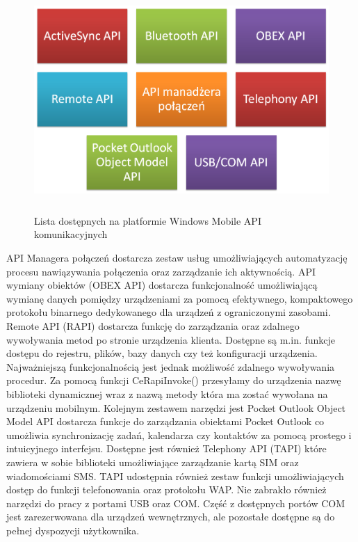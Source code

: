 \begin{figure}[h!]
 \centering \includegraphics[height=85mm]{../images/ch03/wm_comm_api.png}
 \caption{Lista dostępnych na platformie Windows Mobile API komunikacyjnych}
 \label{fig:WMCommunicationAPI}
\end{figure}

API Managera połączeń dostarcza zestaw usług umożliwiających automatyzację
procesu nawiązywania połączenia oraz zarządzanie ich aktywnością. API wymiany
obiektów (OBEX API) dostarcza funkcjonalność umożliwiającą wymianę danych
pomiędzy urządzeniami za pomocą efektywnego, kompaktowego protokołu binarnego
dedykowanego dla urządzeń z ograniczonymi zasobami. Remote API (RAPI) dostarcza
funkcję do zarządzania oraz zdalnego wywoływania metod po stronie urządzenia
klienta. Dostępne są m.in. funkcje dostępu do rejestru, plików, bazy danych czy
też konfiguracji urządzenia. Najważniejszą funkcjonalnością jest jednak możliwość
zdalnego wywoływania procedur. Za pomocą funkcji CeRapiInvoke() przesyłamy do
urządzenia nazwę biblioteki dynamicznej wraz z nazwą metody która ma zostać
wywołana na urządzeniu mobilnym. Kolejnym zestawem narzędzi jest Pocket Outlook
Object Model API dostarcza funkcje do zarządzania obiektami Pocket Outlook  co
umożliwia synchronizację zadań, kalendarza czy kontaktów za pomocą prostego i
intuicyjnego interfejsu. Dostępne jest również Telephony API (TAPI) które zawiera
w sobie biblioteki umożliwiające zarządzanie kartą SIM oraz wiadomościami SMS.
TAPI udostępnia również zestaw funkcji umożliwiających dostęp do funkcji
telefonowania oraz protokołu WAP. Nie zabrakło również narzędzi do pracy z
portami USB oraz COM. Część z dostępnych portów COM jest zarezerwowana dla
urządzeń wewnętrznych, ale pozostałe dostępne są do pełnej dyspozycji
użytkownika.

